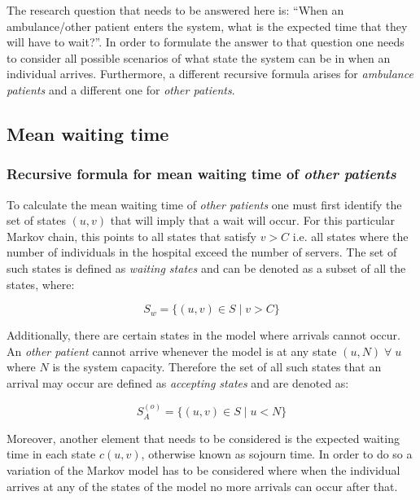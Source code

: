 The research question that needs to be answered here is: ``When an ambulance/other patient enters the system, what is the expected time that they will have to wait?''. In order to formulate the answer to that question one needs to consider all possible scenarios of what state the system can be in when an individual arrives. Furthermore, a different recursive formula arises for \textit{ambulance patients} and a different one for \textit{other patients}.

\subsection{Mean waiting time}
\subsubsection{Recursive formula for mean waiting time of \textit{other patients}}

To calculate the mean waiting time of \textit{other patients} one must first identify the set of states \((u, v)\) that will imply that a wait will occur. For this particular Markov chain, this points to all states that satisfy \(v > C\) i.e. all states where the number of individuals in the hospital exceed the number of servers. The set of such states is defined as \textit{waiting states} and can be denoted as a subset of all the states, where:

\begin{equation} \label{eq:waiting_states}
    S_w = \{(u, v) \in S \; | \; v > C \}    
\end{equation}

Additionally, there are certain states in the model where arrivals cannot occur. An \textit{other patient} cannot arrive whenever the model is at any state $(u, N) \; \forall \; u$ where $N$ is the system capacity. Therefore the set of all such states that an arrival may occur are defined as \textit{accepting states} and are denoted as:

\[
S_A^{(o)} = \{(u, v) \in S \; | \; u < N \}
\]


Moreover, another element that needs to be considered is the expected waiting time in each state \( c(u,v) \), otherwise known as sojourn time. In order to do so a variation of the Markov model has to be considered where when the individual arrives at any of the states of the model no more arrivals can occur after that. 


